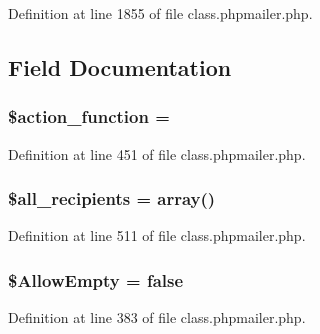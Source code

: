 Definition at line 1855 of file class.\+phpmailer.\+php.



\subsection{Field Documentation}
\subsubsection[{\texorpdfstring{\$action\+\_\+function}{$action_function}}]{\setlength{\rightskip}{0pt plus 5cm}\$action\+\_\+function = \textquotesingle{}\textquotesingle{}}\hypertarget{class_p_h_p_mailer_aa39c535046aa8919dc46727723a94a4a}{}\label{class_p_h_p_mailer_aa39c535046aa8919dc46727723a94a4a}


Definition at line 451 of file class.\+phpmailer.\+php.

\subsubsection[{\texorpdfstring{\$all\+\_\+recipients}{$all_recipients}}]{\setlength{\rightskip}{0pt plus 5cm}\$all\+\_\+recipients = array()\hspace{0.3cm}{\ttfamily [protected]}}\hypertarget{class_p_h_p_mailer_a54b648f01a9df77a1434edd3a9e58462}{}\label{class_p_h_p_mailer_a54b648f01a9df77a1434edd3a9e58462}


Definition at line 511 of file class.\+phpmailer.\+php.

\subsubsection[{\texorpdfstring{\$\+Allow\+Empty}{$AllowEmpty}}]{\setlength{\rightskip}{0pt plus 5cm}\$Allow\+Empty = false}\hypertarget{class_p_h_p_mailer_a10c978cd1c0d14c12013ee1d7cd70bcb}{}\label{class_p_h_p_mailer_a10c978cd1c0d14c12013ee1d7cd70bcb}


Definition at line 383 of file class.\+phpmailer.\+php.

